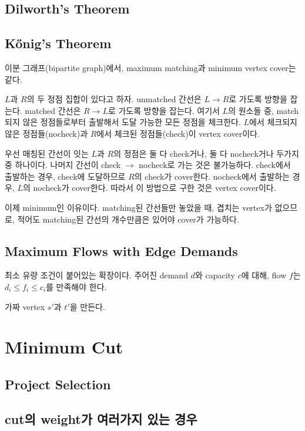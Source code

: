 \documentclass[10pt,twocolumn,letterpaper]{article}
\begin{document}
\subsection{Dilworth's Theorem}

\subsection{Kőnig's Theorem}

이분 그래프(bipartite graph)에서, maximum matching과 minimum vertex cover는 같다.

$L$과 $R$의 두 정점 집합이 있다고 하자. unmatched 간선은 $L \rightarrow R$로 가도록 방향을 잡는다. matched 간선은 $R \rightarrow L$로 가도록 방향을 잡는다.
여기서 $L$의 원소들 중, match되지 않은 정점들로부터 출발해서 도달 가능한 모든 정점을 체크한다.
$L$에서 체크되지 않은 정점들(nocheck)과 $R$에서 체크된 정점들(check)이 vertex cover이다.

우선 매칭된 간선이 잇는 $L$과 $R$의 정점은 둘 다 check거나, 둘 다 nocheck거나 두가지 중 하나이다.
나머지 간선이 check $\rightarrow$ nocheck로  가는 것은 불가능하다.
check에서 출발하는 경우, check에 도달하므로 $R$의 check가 cover한다.
nocheck에서 출발하는 경우, $L$의 nocheck가 cover한다.
따라서 이 방법으로 구한 것은 vertex cover이다.

이제 minimum인 이유이다. matching된 간선들만 놓았을 때, 겹치는 vertex가 없으므로, 적어도 matching된 간선의 개수만큼은 있어야 cover가 가능하다.

\subsection{Maximum Flows with Edge Demands}

최소 유량 조건이 붙어있는 확장이다. 주어진 demand $d$와 capacity $c$에 대해, flow $f$는 $d_i \le f_i \le c_i$를 만족해야 한다.

가짜 vertex $s'$과 $t'$을 만든다.

\section{Minimum Cut}

\subsection{Project Selection}

\subsection{cut의 weight가 여러가지 있는 경우}
\end{document}
